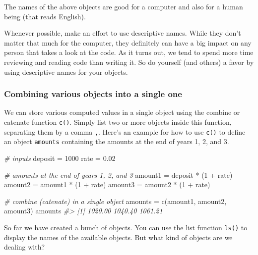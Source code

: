 \documentclass[
]{book}
\newenvironment{Shaded}{\begin{snugshade}}{\end{snugshade}}
\newcommand{\CommentTok}[1]{\textcolor[rgb]{0.56,0.35,0.01}{\textit{#1}}}
\newcommand{\DecValTok}[1]{\textcolor[rgb]{0.00,0.00,0.81}{#1}}
\newcommand{\FloatTok}[1]{\textcolor[rgb]{0.00,0.00,0.81}{#1}}
\newcommand{\FunctionTok}[1]{\textcolor[rgb]{0.00,0.00,0.00}{#1}}
\newcommand{\NormalTok}[1]{#1}
\newcommand{\OtherTok}[1]{\textcolor[rgb]{0.56,0.35,0.01}{#1}}
\newcommand{\SpecialCharTok}[1]{\textcolor[rgb]{0.00,0.00,0.00}{#1}}
\begin{document}
The names of the above objects are good for a computer and also for a human
being (that reads English).

Whenever possible, make an effort to use descriptive names. While they don't
matter that much for the computer, they definitely can have a big impact on
any person that takes a look at the code. As it turns out, we tend to spend
more time reviewing and reading code than writing it. So do yourself
(and others) a favor by using descriptive names for your objects.

\hypertarget{combining-various-objects-into-a-single-one}{%
\subsubsection*{Combining various objects into a single one}\label{combining-various-objects-into-a-single-one}}

We can store various computed values in a single object using the combine or
catenate function \texttt{c()}. Simply list two or more objects inside this function,
separating them by a comma \texttt{,}. Here's an example for how to use \texttt{c()} to
define an object \texttt{amounts} containing the amounts at the end of years 1, 2,
and 3.

\begin{Shaded}
\begin{Highlighting}[]
\CommentTok{\# inputs}
\NormalTok{deposit }\OtherTok{=} \DecValTok{1000}
\NormalTok{rate }\OtherTok{=} \FloatTok{0.02}

\CommentTok{\# amounts at the end of years 1, 2, and 3}
\NormalTok{amount1 }\OtherTok{=}\NormalTok{ deposit }\SpecialCharTok{*}\NormalTok{ (}\DecValTok{1} \SpecialCharTok{+}\NormalTok{ rate)}
\NormalTok{amount2 }\OtherTok{=}\NormalTok{ amount1 }\SpecialCharTok{*}\NormalTok{ (}\DecValTok{1} \SpecialCharTok{+}\NormalTok{ rate)}
\NormalTok{amount3 }\OtherTok{=}\NormalTok{ amount2 }\SpecialCharTok{*}\NormalTok{ (}\DecValTok{1} \SpecialCharTok{+}\NormalTok{ rate)}

\CommentTok{\# combine (catenate) in a single object}
\NormalTok{amounts }\OtherTok{=} \FunctionTok{c}\NormalTok{(amount1, amount2, amount3)}
\NormalTok{amounts}
\CommentTok{\#\textgreater{} [1] 1020.00 1040.40 1061.21}
\end{Highlighting}
\end{Shaded}

So far we have created a bunch of objects. You can use the list function \texttt{ls()}
to display the names of the available objects. But what kind of objects are we
dealing with?
\end{document}
